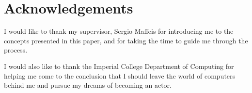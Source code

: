 \section*{Acknowledgements}

I would like to thank my supervisor, Sergio Maffeis for introducing me to the concepts presented in this paper, and for taking the time to guide me through the process. 

I would also like to thank the Imperial College Department of Computing for helping me come to the conclusion that I should leave the world of computers behind me and pursue my dreams of becoming an actor.
